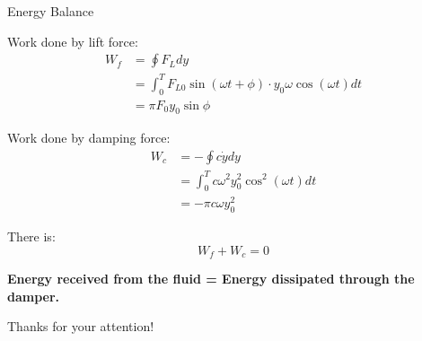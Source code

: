 \documentclass[9pt, xcolor=table]{beamer}
\begin{document}
\begin{frame}{Energy Balance}
	\setlength{\parindent}{2em}

	Work done by lift force:
	\begin{equation}
		\begin{aligned}
		W_{f}&=\oint F_{L} d y \\
		&= \int ^T_0 {F_{L0}} \sin (\omega t + \phi) \cdot y_0 \omega \cos (\omega t) d t \\
		&=\pi F_{0} y_{0} \sin \phi
		\end{aligned}
	\end{equation}

	Work done by damping force:
	\begin{equation}
		\begin{aligned}
		W_{c}&= -\oint c \dot y d y \\
		&= \int ^T_0 c \omega ^2 y_0^2 \cos ^2 (\omega t) d t \\
		&=-\pi c \omega y_{0}^{2}
		\end{aligned}
	\end{equation}

	There is: 
	\begin{equation}
		W_f + W_c = 0
	\end{equation}

	\centering
	\textbf{
	Energy received from the fluid = Energy dissipated through the damper.}

\end{frame}
%


\begin{frame}{}
	\begin{center}
		\Huge Thanks for your attention!\\[2ex] 
		
	\end{center}
\end{frame}
%
\end{document}
